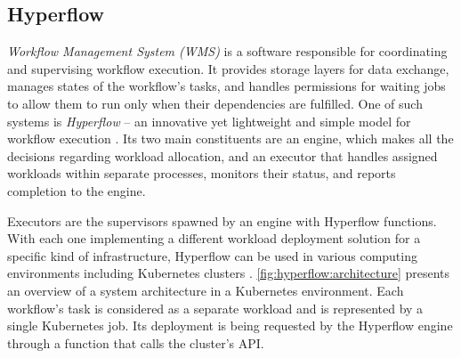 \subsection{Hyperflow}
\label{s:ProblemDomain:Hyperflow}

\emph{Workflow Management System (WMS)} is a software responsible for coordinating and supervising workflow execution.
It provides storage layers for data exchange, manages states of the workflow's tasks, and handles permissions for waiting jobs to allow them to run only when their dependencies are fulfilled.
One of such systems is \emph{Hyperflow} -- an innovative yet lightweight and simple model for workflow execution \cite{b:Hyperflow}.
Its two main constituents are an engine, which makes all the decisions regarding workload allocation, and an executor that handles assigned workloads within separate processes, monitors their status, and reports completion to the engine.


Executors are the supervisors spawned by an engine with Hyperflow functions.
With each one implementing a different workload deployment solution for a specific kind of infrastructure, Hyperflow can be used in various computing environments including Kubernetes clusters \cite{b:Hyperflow-K8s, b:Hyperflow-k8s-deployment}.
 \cref{fig:hyperflow:architecture} presents an overview of a system architecture in a Kubernetes environment.
Each workflow's task is considered as a separate workload and is represented by a single Kubernetes job.
Its deployment is being requested by the Hyperflow engine through a function that calls the cluster's API.


